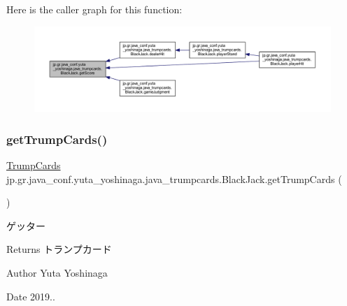 Here is the caller graph for this function\+:
\nopagebreak
\begin{figure}[H]
\begin{center}
\leavevmode
\includegraphics[width=350pt]{classjp_1_1gr_1_1java__conf_1_1yuta__yoshinaga_1_1java__trumpcards_1_1_black_jack_a23b680e89ca3a4c306576ba0a7debfac_icgraph}
\end{center}
\end{figure}
\mbox{\label{classjp_1_1gr_1_1java__conf_1_1yuta__yoshinaga_1_1java__trumpcards_1_1_black_jack_a19f0d24ac49d16b9db099801cc6f7340}} 
\subsubsection{\texorpdfstring{get\+Trump\+Cards()}{getTrumpCards()}}
{\footnotesize\ttfamily \hyperlink{classjp_1_1gr_1_1java__conf_1_1yuta__yoshinaga_1_1java__trumpcards_1_1_trump_cards}{Trump\+Cards} jp.\+gr.\+java\+\_\+conf.\+yuta\+\_\+yoshinaga.\+java\+\_\+trumpcards.\+Black\+Jack.\+get\+Trump\+Cards (\begin{DoxyParamCaption}{ }\end{DoxyParamCaption})}



ゲッター 

\begin{DoxyReturn}{Returns}
トランプカード 
\end{DoxyReturn}
\begin{DoxyAuthor}{Author}
Yuta Yoshinaga 
\end{DoxyAuthor}
\begin{DoxyDate}{Date}
2019.. 
\end{DoxyDate}


